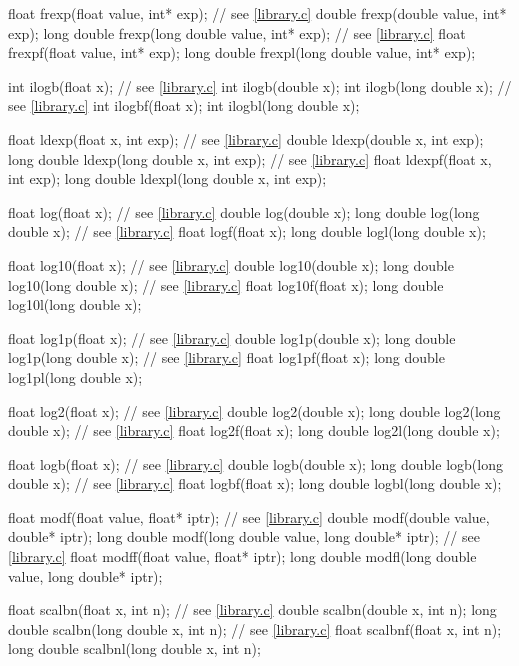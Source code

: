 \begin{codeblock}
{  float frexp(float value, int* exp);   // see \ref{library.c}
  double frexp(double value, int* exp);
  long double frexp(long double value, int* exp);   // see \ref{library.c}
  float frexpf(float value, int* exp);
  long double frexpl(long double value, int* exp);

  int ilogb(float x);                   // see \ref{library.c}
  int ilogb(double x);
  int ilogb(long double x);             // see \ref{library.c}
  int ilogbf(float x);
  int ilogbl(long double x);

  float ldexp(float x, int exp);        // see \ref{library.c}
  double ldexp(double x, int exp);
  long double ldexp(long double x, int exp);    // see \ref{library.c}
  float ldexpf(float x, int exp);
  long double ldexpl(long double x, int exp);

  float log(float x);                   // see \ref{library.c}
  double log(double x);
  long double log(long double x);       // see \ref{library.c}
  float logf(float x);
  long double logl(long double x);

  float log10(float x);                 // see \ref{library.c}
  double log10(double x);
  long double log10(long double x);     // see \ref{library.c}
  float log10f(float x);
  long double log10l(long double x);

  float log1p(float x);                 // see \ref{library.c}
  double log1p(double x);
  long double log1p(long double x);     // see \ref{library.c}
  float log1pf(float x);
  long double log1pl(long double x);

  float log2(float x);                  // see \ref{library.c}
  double log2(double x);
  long double log2(long double x);      // see \ref{library.c}
  float log2f(float x);
  long double log2l(long double x);

  float logb(float x);                  // see \ref{library.c}
  double logb(double x);
  long double logb(long double x);      // see \ref{library.c}
  float logbf(float x);
  long double logbl(long double x);

  float modf(float value, float* iptr); // see \ref{library.c}
  double modf(double value, double* iptr);
  long double modf(long double value, long double* iptr);   // see \ref{library.c}
  float modff(float value, float* iptr);
  long double modfl(long double value, long double* iptr);

  float scalbn(float x, int n);         // see \ref{library.c}
  double scalbn(double x, int n);
  long double scalbn(long double x, int n);     // see \ref{library.c}
  float scalbnf(float x, int n);
  long double scalbnl(long double x, int n);

}
\end{codeblock}
